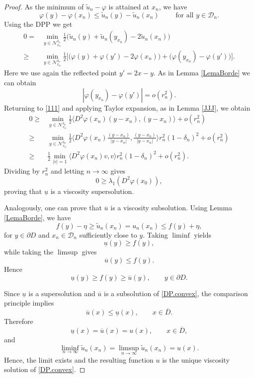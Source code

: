 \documentclass[11pt]{amsart}
\theoremstyle{definition}
\theoremstyle{remark}
\numberwithin{equation}{section}
\newcommand{\half}{\frac{1}{2}}
\newcommand{\Domain}{\mathcal{D}}
\newcommand{\Nc}{{\mathcal N}}
\begin{document}
\begin{proof}
	As the minimum of $\tilde{u}_n - \varphi$ is attained at $x_n$, we have
	\begin{equation}
		\varphi(y)-\varphi(x_n)\le \tilde{u}_n (y)- \tilde{u}_n (x_n) \qquad \text{ for all }y\in\Domain_n.
	\end{equation}
	Using the DPP we get
	\begin{align}
	\displaystyle 	
	0=& \min_{y\in \Nc_{x_n}^{\delta_n}} \half \big( \tilde{u}_n(y) + \tilde{u}_n (y_{x_n})-2 \tilde{u}_n(x_n)\big)\\
			\label{111}
	\displaystyle 
	\ge& \min_{y\in \Nc_{x_n}^{\delta_n}} \half \Big[ \big(\varphi(y)+\varphi(y')-2\varphi(x_n)\big)+\big(\varphi(y_{x_n})-\varphi(y')\big)\Big].
	\end{align}
	Here we use again the reflected point $y'=2x-y$. 
	As in Lemma \ref{LemaBorde} we can obtain
		\[
	|\varphi(y_{x_n})-\varphi(y')| = o(r_n^2).
	\]
	Returning to \eqref{111} and applying Taylor expansion, as in Lemma \ref{JJJ}, we obtain
	\begin{align}
	\displaystyle 
	0\ge& \min_{y\in \Nc_{x_n}^{\delta_n}}\half\langle D^2\varphi(x_n)(y-x_n),(y-x_n)\rangle+o(r_n^2)\\
	\displaystyle 
	\ge& \min_{y\in \Nc_{x_n}^{\delta_n}}\half\langle D^2\varphi(x_n)\frac{(y-x_n)}{|y-x_n|},\frac{(y-x_n)}{|y-x_n|}\rangle r_n^2(1-\delta_n)^2+o(r_n^2)\\
	\displaystyle 
	\ge& \half \min_{|v|=1}\langle D^2\varphi(x_n)v,v\rangle r_n^2(1-\delta_n)^2+o(r_n^2).
	\end{align}
	Dividing by $r_n^2$ and letting $n\to\infty$ gives
	\[
	0 \geq \lambda_1(D^2\varphi(x_0)),
	\]
	proving that $\underline{u}$ is a viscosity supersolution. 

	Analogously, one can prove that $\overline{u}$ is a viscosity subsolution. Using Lemma \ref{LemaBorde}, we have
	\[
	f(y)-\eta \ge \tilde{u}_n (x_n) = u_n(x_n) \le f(y)+\eta,
	\]
	for $y\in\partial D$ and $x_n\in\Domain_n$ sufficiently close to $y$. Taking $\liminf$ yields
	\[
	\underline{u}(y)\ge f(y),
	\]
	while taking the $\limsup$ gives
	\[
	\overline{u}(y)\le f(y).
	\]
	Hence
	\[
	\underline{u}(y)\geq f(y) \geq 
	\overline{u}(y), \qquad y \in \partial D.
	\]

	Since $\underline{u}$ is a supersolution and $\overline{u}$ is a subsolution of \eqref{DP.convex}, the comparison principle implies
	\[
	\overline{u}(x)\le\underline{u}(x),\qquad x \in \overline{D}.
	\] 
	Therefore
	\[
	\underline{u}(x)=\overline{u}(x)=u(x), \qquad x \in \overline{D},
	\] 
	and 
	\[
	\liminf_{n\to \infty} \tilde{u}_n(x_n) = \limsup_{n\to \infty} \tilde{u}_n(x_n) = u(x).
	\]
	Hence, the limit exists and the resulting function $u$ is the unique viscosity solution of \eqref{DP.convex}. 
\end{proof}
\end{document}
